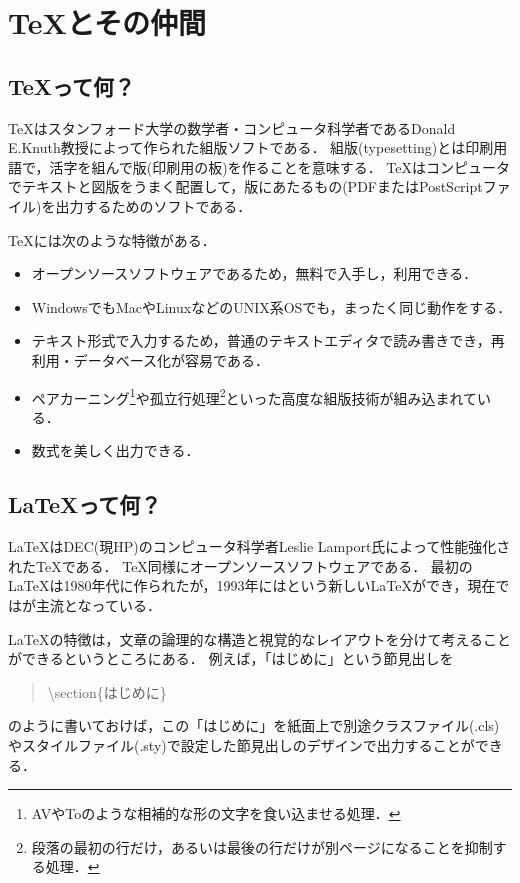 \section{\TeX とその仲間}
\subsection{\TeX って何？}

\TeX はスタンフォード大学の数学者・コンピュータ科学者であるDonald E.Knuth教授によって作られた組版ソフトである．
組版(typesetting)とは印刷用語で，活字を組んで版(印刷用の板)を作ることを意味する．
\TeX はコンピュータでテキストと図版をうまく配置して，版にあたるもの(PDFまたはPostScriptファイル)を出力するためのソフトである．

\TeX には次のような特徴がある．
\begin{itemize}
  \item オープンソースソフトウェアであるため，無料で入手し，利用できる．
  \item WindowsでもMacやLinuxなどのUNIX系OSでも，まったく同じ動作をする．
  \item テキスト形式で入力するため，普通のテキストエディタで読み書きでき，再利用・データベース化が容易である．
  \item ペアカーニング\footnote{AVやToのような相補的な形の文字を食い込ませる処理．}や孤立行処理\footnote{段落の最初の行だけ，あるいは最後の行だけが別ページになることを抑制する処理．}といった高度な組版技術が組み込まれている．
  \item 数式を美しく出力できる．
\end{itemize}

\subsection{\LaTeX って何？}

\LaTeX はDEC(現HP)のコンピュータ科学者Leslie Lamport氏によって性能強化された\TeX である．
\TeX 同様にオープンソースソフトウェアである．
最初の\LaTeX は1980年代に作られたが，1993年には\LaTeXe という新しい\LaTeX ができ，現在では\LaTeXe が主流となっている．

\LaTeX の特徴は，文章の論理的な構造と視覚的なレイアウトを分けて考えることができるというところにある．
例えば，「はじめに」という節見出しを
\begin{quote}
  \textbackslash section\{はじめに\}
\end{quote}
のように書いておけば，この「はじめに」を紙面上で別途クラスファイル(.cls)やスタイルファイル(.sty)で設定した節見出しのデザインで出力することができる．

